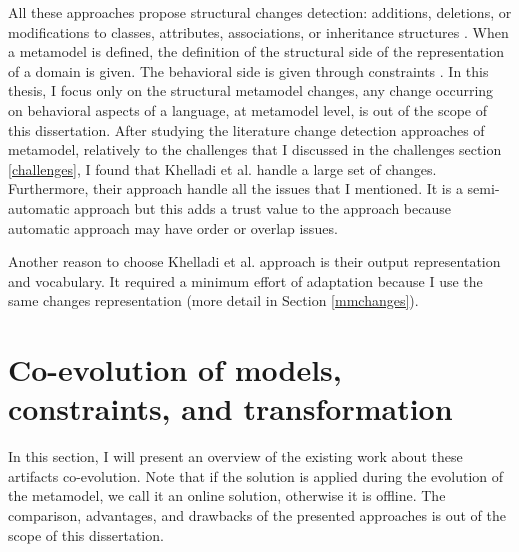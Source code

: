 All these approaches propose structural changes detection: additions, deletions, or modifications to classes, attributes, associations, or inheritance structures \cite{10.1007/s10270-013-0392-y}. When a metamodel is defined, the definition of the structural side of the representation of a domain is given. The behavioral side is given through constraints \cite{10.1007/s10515-009-0053-0}. In this thesis, I focus only on the structural metamodel changes, any change occurring on behavioral aspects of a language, at metamodel level, is out of the scope of this dissertation.
After studying the literature change detection approaches of metamodel, relatively to the challenges that I discussed in the challenges section \ref{challenges}, I found that Khelladi et al. \cite{khelladi2016detecting} handle a large set of changes. Furthermore, their approach handle all the issues that I mentioned. 
It is a semi-automatic approach but this adds a trust value to the approach because automatic approach may have order or overlap issues.

Another reason to choose Khelladi et al. \cite{khelladi2016detecting} approach is their output representation and vocabulary. It required a minimum effort of adaptation because I use the same changes representation (more detail in Section \ref{mmchanges}).


 \section{Co-evolution of models, constraints, and transformation}
 \label{coevolutionartifacts}
  In this section, I will present an overview of the existing work about these artifacts co-evolution. Note that if the solution is applied during the evolution of the metamodel, we call it an online solution, otherwise it is offline.
 The comparison, advantages, and drawbacks of the presented approaches is out of the scope of this dissertation.
 

